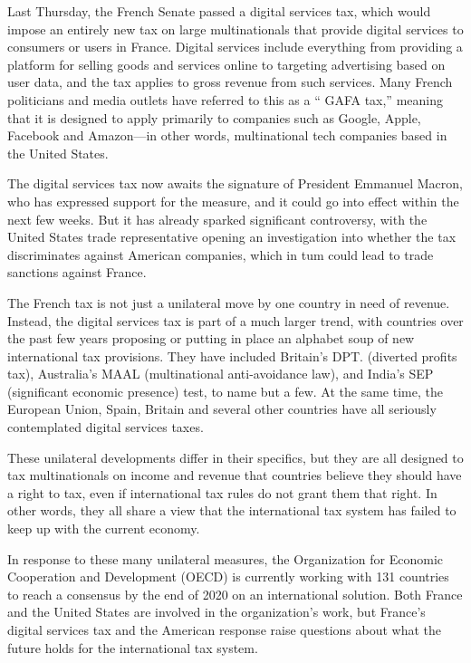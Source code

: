 Last Thursday, the French Senate passed a digital services tax, which
would impose an entirely new tax on large multinationals that provide
digital services to consumers or users in France. Digital services
include everything from providing a platform for selling goods and
services online to targeting advertising based on user data, and the tax
applies to gross revenue from such services. Many French politicians and
media outlets have referred to this as a `` GAFA tax,'' meaning that it
is designed to apply primarily to companies such as Google, Apple,
Facebook and Amazon---in other words, multinational tech companies based
in the United States.

The digital services tax now awaits the signature of President Emmanuel
Macron, who has expressed support for the measure, and it could go into
effect within the next few weeks. But it has already sparked significant
controversy, with the United States trade representative opening an
investigation into whether the tax discriminates against American
companies, which in tum could lead to trade sanctions against France.

The French tax is not just a unilateral move by one country in need of
revenue.
Instead, the digital services tax is part of a much larger trend, with
countries over the past few years proposing or putting in place an
alphabet soup of new international tax provisions. They have included
Britain's DPT. (diverted profits tax), Australia's MAAL (multinational
anti-avoidance law), and India's SEP (significant economic presence)
test, to name but a few. At the same time, the European Union, Spain,
Britain and several other countries have all seriously contemplated
digital services taxes.

These unilateral developments differ in their specifics, but they are
all designed to tax multinationals on income and revenue that countries
believe they should have a right to tax, even if international tax rules
do not grant them that right. In other words, they all share a view that
the international tax system has failed to keep up with the current
economy.

In response to these many unilateral measures, the Organization for
Economic Cooperation and Development (OECD) is currently working with
131 countries to reach a consensus by the end of 2020 on an
international solution. Both France and the United States are involved
in the organization's work, but France's digital services tax and the
American response raise questions about what the future holds for the
international tax system.

